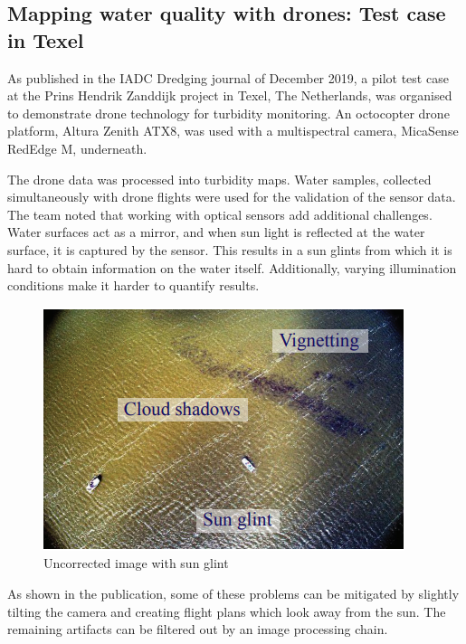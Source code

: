\newpage
\subsection{Mapping water quality with drones: Test case in Texel} \label{similarprojects/multispectral}

As published in the IADC Dredging journal of December 2019, \cite{terraetaqua} a pilot test case at the Prins Hendrik Zanddijk project in Texel, The Netherlands, was organised to demonstrate drone technology for turbidity monitoring. An octocopter drone platform, Altura Zenith ATX8, was used with a multispectral camera, MicaSense RedEdge M, underneath.

The drone data was processed into turbidity maps. Water samples, collected simultaneously with drone flights were used for the validation of the sensor data.\\

The team noted that working with optical sensors add additional challenges. Water surfaces act as a mirror, and when sun light is reflected at the water surface, it is captured by the sensor. This results in a sun glints from which it is hard to obtain information on the water itself. Additionally, varying illumination conditions make it harder to quantify results.

\begin{figure}[h]
\centering
\includegraphics[scale=1]{similarprojects/31_uncorrected.png}
\caption{Uncorrected image with sun glint \cite{terraetaqua}}
\end{figure}

As shown in the publication, some of these problems can be mitigated by slightly tilting the camera and creating flight plans which look away from the sun. The remaining artifacts can be filtered out by an image processing chain.

